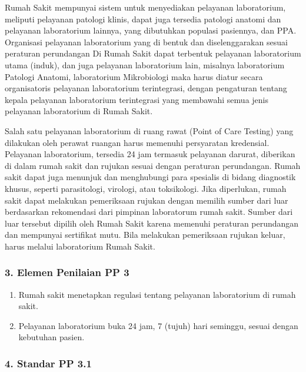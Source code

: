 \documentclass[
]{book}
\providecommand{\tightlist}{%
  \setlength{\itemsep}{0pt}\setlength{\parskip}{0pt}}
\begin{document}
Rumah Sakit mempunyai sistem untuk menyediakan pelayanan laboratorium, meliputi pelayanan patologi klinis, dapat juga tersedia patologi anatomi dan pelayanan laboratorium lainnya, yang dibutuhkan populasi pasiennya, dan PPA. Organisasi pelayanan laboratorium yang di bentuk dan diselenggarakan sesuai peraturan perundangan Di Rumah Sakit dapat terbentuk pelayanan laboratorium utama (induk), dan juga pelayanan laboratorium lain, misalnya laboratorium Patologi Anatomi, laboratorium Mikrobiologi maka harus diatur secara organisatoris pelayanan laboratorium terintegrasi, dengan pengaturan tentang kepala pelayanan laboratorium terintegrasi yang membawahi semua jenis pelayanan laboratorium di Rumah Sakit.

Salah satu pelayanan laboratorium di ruang rawat (Point of Care Testing) yang dilakukan oleh perawat ruangan harus memenuhi persyaratan kredensial. Pelayanan laboratorium, tersedia 24 jam termasuk pelayanan darurat, diberikan di dalam rumah sakit dan rujukan sesuai dengan peraturan perundangan. Rumah sakit dapat juga menunjuk dan menghubungi para spesialis di bidang diagnostik khusus, seperti parasitologi, virologi, atau toksikologi. Jika diperlukan, rumah sakit dapat melakukan pemeriksaan rujukan dengan memilih sumber dari luar berdasarkan rekomendasi dari pimpinan laboratorum rumah sakit. Sumber dari luar tersebut dipilih oleh Rumah Sakit karena memenuhi peraturan perundangan dan mempunyai sertifikat mutu. Bila melakukan pemeriksaan rujukan keluar, harus melalui laboratorium Rumah Sakit.

\hypertarget{elemen-penilaian-pp-3}{%
\subsubsection*{3. Elemen Penilaian PP 3}\label{elemen-penilaian-pp-3}}

\begin{enumerate}
\def\labelenumi{\alph{enumi}.}
\tightlist
\item
  Rumah sakit menetapkan regulasi tentang pelayanan laboratorium di rumah sakit.
\item
  Pelayanan laboratorium buka 24 jam, 7 (tujuh) hari seminggu, sesuai dengan kebutuhan pasien.
\end{enumerate}

\hypertarget{standar-pp-3.1}{%
\subsubsection*{4. Standar PP 3.1}\label{standar-pp-3.1}}
\end{document}
